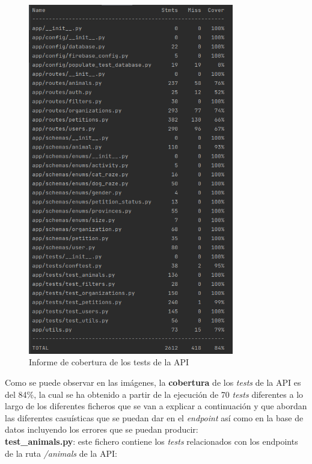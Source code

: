 \begin{figure}[H]
    \centering
    \includegraphics[width=0.8\textwidth]{imgs/coverage1.png}
    \caption{Informe de cobertura de los tests de la API}
    \label{fig:coverage1}
\end{figure}

\newpage

Como se puede observar en las imágenes, la \textbf{cobertura} de los \textit{tests} de la API es del 84\%, la cual se ha obtenido
a partir de la ejecución de 70 \textit{tests} diferentes a lo largo de los diferentes ficheros que se van a explicar
a continuación y que abordan las diferentes casuísticas que se puedan dar en el \textit{endpoint} así como en la base de datos
incluyendo los errores que se puedan producir: \\

\textbf{test\_animals.py}: este fichero contiene los \textit{tests} relacionados con los endpoints de la ruta \textit{/animals} de la API:

